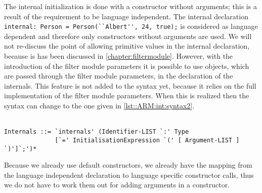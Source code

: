 The internal initialization is done with a constructor without arguments;
this is a result of the requirement to be language independent. The internal declaration 
\lstinline!internal: Person = Person(``Albert'', 24, true);! is considered as language dependent and therefore
only constructors without arguments are used. We will not re-discuss the point of allowing primitive values
in the internal declaration, because is has been discussed in \autoref{chapter:filtermodule}.
However, with the introduction of the filter module parameters it is possible to
use objects, which are passed through the filter module parameters, in the declaration of the internals.
This feature is not added to the syntax yet, because it relies on the full implementation of the filter
module parameters. When this is realized then the syntax can change to the one given in \autoref{lst::ARM:int:syntax2}.
\\\\
\begin{lstlisting}[caption = {Proposed internal syntax}, label = lst::ARM:int:syntax2,
style = listing, language = ebnf]
Internals ::= `internals' (Identifier-LIST `:' Type 
              [`=' InitialisationExpression `(' [ Argument-LIST ] `)']`;')*
\end{lstlisting}
Because we already use default constructors, we already have the mapping from the language independent declaration to language specific constructor calls, thus we do not have to work them out for adding arguments in a constructor.